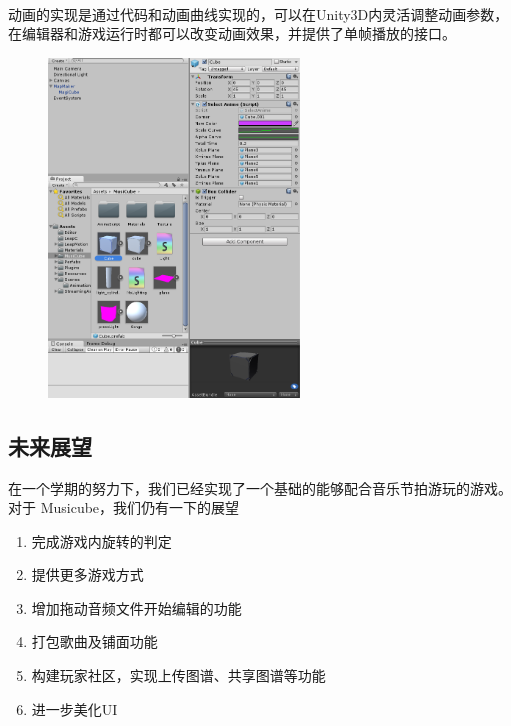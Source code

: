 \documentclass{article}
\begin{document}
\paragraph{}
动画的实现是通过代码和动画曲线实现的，可以在Unity3D内灵活调整动画参数，在编辑器和游戏运行时都可以改变动画效果，并提供了单帧播放的接口。
\begin{figure}[H]
  \centering
  \includegraphics[width=18em]{work1.png}\\
  \caption{}\label{}
\end{figure}
\newpage
\subsection{未来展望}
在一个学期的努力下，我们已经实现了一个基础的能够配合音乐节拍游玩的游戏。对于
Musicube，我们仍有一下的展望
\begin{enumerate}
  \item 完成游戏内旋转的判定
  \item 提供更多游戏方式
  \item 增加拖动音频文件开始编辑的功能
  \item 打包歌曲及铺面功能
  \item 构建玩家社区，实现上传图谱、共享图谱等功能
  \item 进一步美化UI
\end{enumerate}
\end{document}
